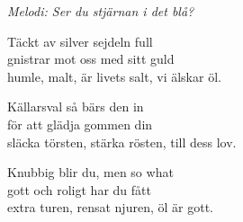 {\footnotesize\textit{Melodi: Ser du stjärnan i det blå?}}\par
\vspace{10pt}
Täckt av silver sejdeln full\\
gnistrar mot oss med sitt guld\\
humle, malt, är livets salt, vi älskar öl.\par
\vspace{10pt}
Källarsval så bärs den in\\
för att glädja gommen din\\
släcka törsten, stärka rösten, till dess lov.\par
\vspace{10pt}
Knubbig blir du, men so what\\
gott och roligt har du fått\\
extra turen, rensat njuren, öl är gott.
